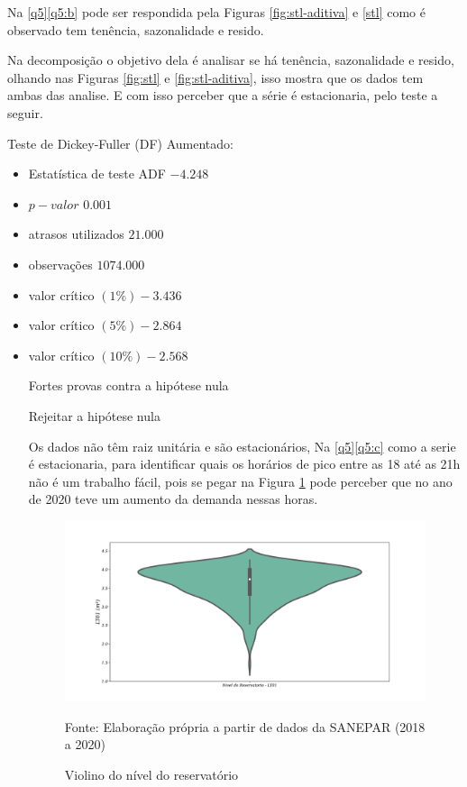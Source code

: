  Na  \ref{q5}\ref{q5:b} pode ser respondida pela Figuras \ref{fig:stl-aditiva} e \ref{stl} como é observado tem tenência, sazonalidade e resido.
 
Na decomposição o objetivo dela é analisar se há tenência, sazonalidade e resido, olhando nas Figuras \ref{fig:stl} e \ref{fig:stl-aditiva}, isso mostra que os dados tem ambas das analise. E com isso perceber que a série é estacionaria, pelo teste a seguir.

Teste de Dickey-Fuller (DF) Aumentado: 
\begin{itemize}
	\item Estatística de teste ADF     $-4.248$
\item $p-valor$                       $0.001$
\item atrasos utilizados         $21.000$
\item  observações              $1074.000$
\item valor crítico $(1\%)           -3.436$
\item valor crítico $(5\%)           -2.864$
\item valor crítico $(10\%)          -2.568$


Fortes provas contra a hipótese nula

Rejeitar a hipótese nula

Os dados não têm raiz unitária e são estacionários, Na \ref{q5}\ref{q5:c} como a serie é estacionaria, para identificar quais os horários de pico entre as 18 até as 21h não é um trabalho fácil, pois se pegar na Figura \ref{fig:hist} pode perceber que no ano de 2020 teve um aumento da demanda nessas horas.

\begin{figure}[H]
	\centering
	\caption{Violino do nível do reservatório}
	\label{fig:hist}
	\includegraphics[width=1\linewidth]{Resultados/Figuras/viol}
	
	Fonte: Elaboração própria a partir de dados da SANEPAR (2018 a 2020)
\end{figure}


\end{itemize}
